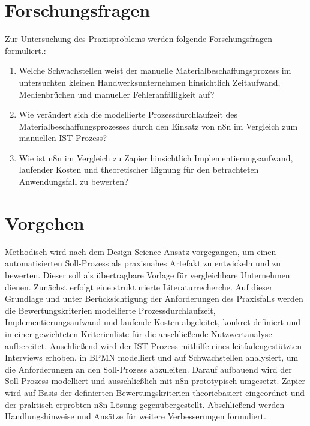 ﻿\documentclass[a4paper,11pt]{article}
\begin{document}
\section{Forschungsfragen}
Zur Untersuchung des Praxisproblems werden folgende Forschungsfragen formuliert.:
\begin{enumerate}
    \item Welche Schwachstellen weist der manuelle Materialbeschaffungsprozess im untersuchten kleinen Handwerksunternehmen hinsichtlich Zeitaufwand, Medienbrüchen und manueller Fehleranfälligkeit auf?
    \item Wie verändert sich die modellierte Prozessdurchlaufzeit des Materialbeschaffungsprozesses durch den Einsatz von n8n im Vergleich zum manuellen IST-Prozess?
    \item Wie ist n8n im Vergleich zu Zapier hinsichtlich Implementierungsaufwand, laufender Kosten und theoretischer Eignung für den betrachteten Anwendungsfall zu bewerten?
\end{enumerate}

\section{Vorgehen}
Methodisch wird nach dem Design-Science-Ansatz vorgegangen, um einen automatisierten Soll-Prozess als praxisnahes Artefakt zu entwickeln und zu bewerten. Dieser soll als übertragbare Vorlage für vergleichbare Unternehmen dienen. Zunächst erfolgt eine strukturierte Literaturrecherche. Auf dieser Grundlage und unter Berücksichtigung der Anforderungen des Praxisfalls werden die Bewertungskriterien modellierte Prozessdurchlaufzeit, Implementierungsaufwand und laufende Kosten abgeleitet, konkret definiert und in einer gewichteten Kriterienliste für die anschließende Nutzwertanalyse aufbereitet. Anschließend wird der IST-Prozess mithilfe eines leitfadengestützten Interviews erhoben, in BPMN modelliert und auf Schwachstellen analysiert, um die Anforderungen an den Soll-Prozess abzuleiten. Darauf aufbauend wird der Soll-Prozess modelliert und ausschließlich mit n8n prototypisch umgesetzt. Zapier wird auf Basis der definierten Bewertungskriterien theoriebasiert eingeordnet und der praktisch erprobten n8n-Lösung gegenübergestellt. Abschließend werden Handlungshinweise und Ansätze für weitere Verbesserungen formuliert.
\end{document}
